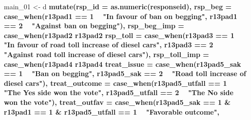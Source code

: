 \documentclass[]{book}
\newenvironment{Shaded}{\begin{snugshade}}{\end{snugshade}}
\newcommand{\KeywordTok}[1]{\textcolor[rgb]{0.13,0.29,0.53}{\textbf{#1}}}
\newcommand{\DataTypeTok}[1]{\textcolor[rgb]{0.13,0.29,0.53}{#1}}
\newcommand{\DecValTok}[1]{\textcolor[rgb]{0.00,0.00,0.81}{#1}}
\newcommand{\StringTok}[1]{\textcolor[rgb]{0.31,0.60,0.02}{#1}}
\newcommand{\OperatorTok}[1]{\textcolor[rgb]{0.81,0.36,0.00}{\textbf{#1}}}
\newcommand{\NormalTok}[1]{#1}
\begin{document}
\begin{Shaded}
\begin{Highlighting}[]
\NormalTok{main_}\DecValTok{01}\NormalTok{ <-}\StringTok{ }\NormalTok{d }\OperatorTok{%>%}\StringTok{ }
\StringTok{  }\KeywordTok{mutate}\NormalTok{(}\DataTypeTok{rsp_id =} \KeywordTok{as.numeric}\NormalTok{(responseid),}
         \DataTypeTok{rsp_beg =} \KeywordTok{case_when}\NormalTok{(r13pad1 }\OperatorTok{==}\StringTok{ }\DecValTok{1} \OperatorTok{~}\StringTok{ "In favour of ban on begging"}\NormalTok{,}
\NormalTok{                             r13pad1 }\OperatorTok{==}\StringTok{ }\DecValTok{2} \OperatorTok{~}\StringTok{ "Against ban on begging"}\NormalTok{),}
         \DataTypeTok{rsp_beg_imp =} \KeywordTok{case_when}\NormalTok{(r13pad2 }\OperatorTok{%in%}\StringTok{ }\DecValTok{1}\OperatorTok{:}\DecValTok{2} \OperatorTok{~}\StringTok{ "Important"}\NormalTok{,}
\NormalTok{                                  r13pad2 }\OperatorTok{%in%}\StringTok{ }\DecValTok{3}\OperatorTok{:}\DecValTok{5} \OperatorTok{~}\StringTok{ "Not important"}\NormalTok{),}
         \DataTypeTok{rsp_toll =} \KeywordTok{case_when}\NormalTok{(r13pad3 }\OperatorTok{==}\StringTok{ }\DecValTok{1} \OperatorTok{~}\StringTok{ "In favour of road toll increase of diesel cars"}\NormalTok{,}
\NormalTok{                              r13pad3 }\OperatorTok{==}\StringTok{ }\DecValTok{2} \OperatorTok{~}\StringTok{ "Against road toll increase of diesel cars"}\NormalTok{),}
         \DataTypeTok{rsp_toll_imp =} \KeywordTok{case_when}\NormalTok{(r13pad4 }\OperatorTok{%in%}\StringTok{ }\DecValTok{1}\OperatorTok{:}\DecValTok{2} \OperatorTok{~}\StringTok{ "Important"}\NormalTok{,}
\NormalTok{                                  r13pad4 }\OperatorTok{%in%}\StringTok{ }\DecValTok{3}\OperatorTok{:}\DecValTok{5} \OperatorTok{~}\StringTok{ "Not important"}\NormalTok{),}
         \DataTypeTok{treat_issue =} \KeywordTok{case_when}\NormalTok{(r13pad5_sak }\OperatorTok{==}\StringTok{ }\DecValTok{1} \OperatorTok{~}\StringTok{ "Ban on begging"}\NormalTok{,}
\NormalTok{                               r13pad5_sak }\OperatorTok{==}\StringTok{ }\DecValTok{2} \OperatorTok{~}\StringTok{ "Road toll increase of diesel cars"}\NormalTok{),}
         \DataTypeTok{treat_outcome =} \KeywordTok{case_when}\NormalTok{(r13pad5_utfall }\OperatorTok{==}\StringTok{ }\DecValTok{1} \OperatorTok{~}\StringTok{ "The Yes side won the vote"}\NormalTok{,}
\NormalTok{                                 r13pad5_utfall }\OperatorTok{==}\StringTok{ }\DecValTok{2} \OperatorTok{~}\StringTok{ "The No side won the vote"}\NormalTok{),}
          \DataTypeTok{treat_outfav =} \KeywordTok{case_when}\NormalTok{(r13pad5_sak }\OperatorTok{==}\StringTok{ }\DecValTok{1} \OperatorTok{&}\StringTok{ }\NormalTok{r13pad1 }\OperatorTok{==}\StringTok{ }\DecValTok{1} \OperatorTok{&}\StringTok{ }\NormalTok{r13pad5_utfall }\OperatorTok{==}\StringTok{ }\DecValTok{1} \OperatorTok{~}\StringTok{ "Favorable outcome"}\NormalTok{,}
}}}}}
\end{Highlighting}
\end{Shaded}
\end{document}

